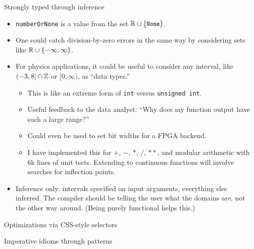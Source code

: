 \documentclass{beamer}
\begin{document}
\begin{frame}{Strongly typed through inference}
\vspace{0.3 cm}
\begin{itemize}
\item<1-> {\tt \small numberOrNone} is a value from the set $\Bbb{R} \cup \{\mbox{\tt \small None}\}$.

\item<2-> One could catch division-by-zero errors in the same way by considering sets like $\Bbb{R} \cup \{-\infty, \infty\}$.

\item<3-> For physics applications, it could be useful to consider any interval, like $(-3, 8] \cap \Bbb{Z}$ or $[0, \infty)$, as ``data types.''
\begin{itemize}
\item<4-> This is like an extreme form of {\tt \small int} versus {\tt \small unsigned int}.
\item<4-> Useful feedback to the data analyst: ``Why does my function output have such a large range?''
\item<4-> Could even be used to set bit widths for a FPGA backend.
\item<4-> I have implemented this for $+$, $-$, $*$, $/$, $**$, and modular arithmetic with 6k lines of unit tests. Extending to continuous functions will involve searches for inflection points.
\end{itemize}
\item<5-> Inference only: intervals specified on input arguments, everything else inferred. The compiler should be telling the user what the domains are, not the other way around. (Being purely functional helps this.)
\end{itemize}
\end{frame}

\begin{frame}{Optimizations via CSS-style selectors}
\end{frame}

\begin{frame}{Imperative idioms through patterns}
\end{frame}
\end{document}
